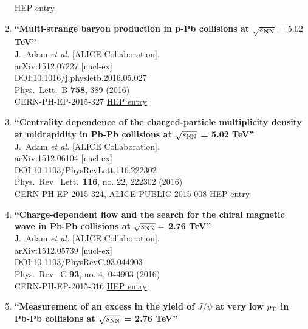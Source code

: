\begin{enumerate}
\href{http://inspirehep.net/record/1411653}{HEP entry}
\item%
{\bf ``Multi-strange baryon production in p-Pb collisions at $\sqrt{s_\mathbf{NN}}=5.02$ TeV''}
  \\{}J.~Adam {\it et al.} [ALICE Collaboration].
  \\{}arXiv:1512.07227 [nucl-ex]
  \\{}DOI:10.1016/j.physletb.2016.05.027
  \\{}Phys.\ Lett.\ B {\bf 758}, 389 (2016)
  \\{}CERN-PH-EP-2015-327
\href{http://inspirehep.net/record/1411084}{HEP entry}
\item%
{\bf ``Centrality dependence of the charged-particle multiplicity density at \linebreak midrapidity in Pb-Pb collisions at $\sqrt{s_{\rm NN}}$ = 5.02 TeV''}
  \\{}J.~Adam {\it et al.} [ALICE Collaboration].
  \\{}arXiv:1512.06104 [nucl-ex]
  \\{}DOI:10.1103/PhysRevLett.116.222302
  \\{}Phys.\ Rev.\ Lett.\  {\bf 116}, no. 22, 222302 (2016)
  \\{}CERN-PH-EP-2015-324, ALICE-PUBLIC-2015-008
\href{http://inspirehep.net/record/1410589}{HEP entry}
\item%
{\bf ``Charge-dependent flow and the search for the chiral magnetic wave in Pb-Pb collisions at $\sqrt{s_{\rm NN}} =$ 2.76 TeV''}
  \\{}J.~Adam {\it et al.} [ALICE Collaboration].
  \\{}arXiv:1512.05739 [nucl-ex]
  \\{}DOI:10.1103/PhysRevC.93.044903
  \\{}Phys.\ Rev.\ C {\bf 93}, no. 4, 044903 (2016)
  \\{}CERN-PH-EP-2015-316
\href{http://inspirehep.net/record/1410144}{HEP entry}
\item%
{\bf ``Measurement of an excess in the yield of $J/\psi$ at very low $p_{\rm T}$ in Pb-Pb collisions at $\sqrt{s_{\rm NN}}$ = 2.76 TeV''}

\end{enumerate}
